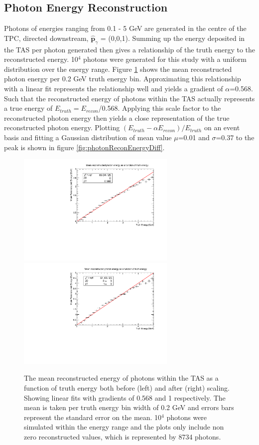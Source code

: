 \subsection{Photon Energy Reconstruction}
Photons of energies ranging from 0.1 - 5 GeV are generated in the centre of the TPC, directed downstream, $\boldsymbol{\hat{p}}_{\gamma}$ = (0,0,1). Summing up the energy deposited in the TAS per photon generated then gives a relationship of the truth energy to the reconstructed energy. 10$^{4}$ photons were generated for this study with a uniform distribution over the energy range. Figure \ref{fig:photonMeanReconEnergy} shows the mean reconstructed photon energy per 0.2 GeV truth energy bin. Approximating this relationship with a linear fit represents the relationship well and yields a gradient of $\alpha$=0.568. Such that the reconstructed energy of photons within the TAS actually represents a true energy of $E_{truth} =  E_{recon}$/0.568. Applying this scale factor to the reconstructed photon energy then yields a close representation of the true reconstructed photon energy. Plotting $(E_{truth} - \alpha E_{recon})/E_{truth}$ on an event basis and fitting a Gaussian distribution of mean value $\mu$=0.01 and $\sigma$=0.37 to the peak is shown in figure \ref{fig:photonReconEnergyDiff}. 

\begin{figure}[htbp]
\begin{center}
  	\includegraphics[width=76mm]{Chapter4/figures/testPhoton_energy_meanRecon.pdf}
  	\includegraphics[width=76mm]{Chapter4/figures/testPhoton_energy_meanRecon_scaled.pdf}
		\caption{The mean reconstructed energy of photons within the TAS as a function of truth energy both before (left) and after (right) scaling. Showing linear fits with gradients of 0.568 and 1 respectively. The mean is taken per truth energy bin width of 0.2 GeV and errors bars represent the standard error on the mean. 10$^{4}$ photons were simulated within the energy range and the plots only include non zero reconstructed values, which is represented by 8734 photons.}
	\label{fig:photonMeanReconEnergy}
\end{center}
\end{figure}

